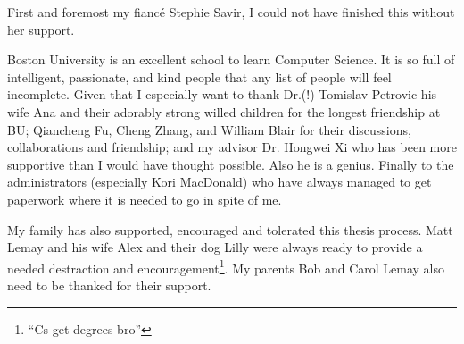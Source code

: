 First and foremost my fiancé Stephie Savir, I could not have finished this without her support. %
 
Boston University is an excellent school to learn Computer Science.
It is so full of intelligent, passionate, and kind people that any list of people will feel incomplete.
Given that I especially want to thank Dr.(!) Tomislav Petrovic his wife Ana and their adorably strong willed children for the longest friendship at BU;
Qiancheng Fu, Cheng Zhang, and William Blair for their discussions, collaborations and friendship;
and my advisor Dr. Hongwei Xi who has been more supportive than I would have thought possible.
Also he is a genius.
Finally to the administrators (especially Kori MacDonald) who have always managed to get paperwork where it is needed to go in spite of me.

My family has also supported, encouraged and tolerated this thesis process.
Matt Lemay and his wife Alex and their dog Lilly were always ready to provide a needed destraction and encouragement\footnote{``Cs get degrees bro''}.
My parents Bob and Carol Lemay also need to be thanked for their support.
 

